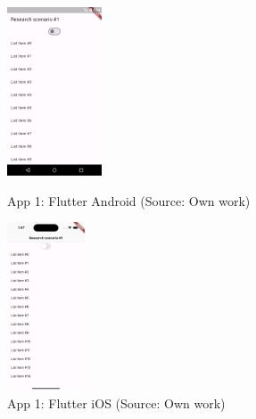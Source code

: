\begin{figure}[H]
  \begin{minipage}{.47\textwidth}
    \centering
    \includegraphics[height=50mm]{img/app1_flutter_android}
    \caption{App 1: Flutter Android (Source: Own work)}
    \label{fig:app1_flutter_android}
  \end{minipage}
  \hfill
  \begin{minipage}{.47\textwidth}
    \centering
    \includegraphics[height=50mm]{img/app1_flutter_ios}
    \caption{App 1: Flutter iOS (Source: Own work)}
    \label{fig:app1_flutter_ios}
  \end{minipage}
\end{figure}

